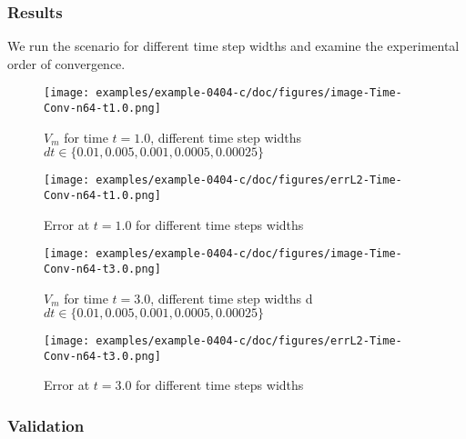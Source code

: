 \subsubsection{Results}
We run the scenario for different time step widths and examine the experimental order of convergence.
%
%
%
%
\begin{figure}[h!]
    \centering 
    \texttt{[image: examples/example-0404-c/doc/figures/image-Time-Conv-n64-t1.0.png]} 
    \caption{$V_m$ for time $t=1.0$, different time step widths ${dt \in \{0.01, 0.005, 0.001, 0.0005, 0.00025\}}$}
    \label{example-0404-c-vm-1.0}
\end{figure}
%
\begin{figure}[h!]
    \centering 
    \texttt{[image: examples/example-0404-c/doc/figures/errL2-Time-Conv-n64-t1.0.png]} 
    \caption{Error at $t=1.0$ for different time steps widths}
    \label{example-0404-c-error-1.0}
\end{figure}
\begin{figure}[h!]
    \centering 
    \texttt{[image: examples/example-0404-c/doc/figures/image-Time-Conv-n64-t3.0.png]} 
    \caption{$V_m$ for time $t=3.0$, different time step widths d${dt \in \{0.01, 0.005, 0.001, 0.0005, 0.00025\}}$}
    \label{example-0404-c-vm-3.0}
\end{figure}
%
\begin{figure}[h!]
    \centering 
    \texttt{[image: examples/example-0404-c/doc/figures/errL2-Time-Conv-n64-t3.0.png]} 
    \caption{Error at $t=3.0$ for different time steps widths}
    \label{example-0404-c-error-3.0}
\end{figure}
%
%
%
\subsubsection{Validation}
%
%
